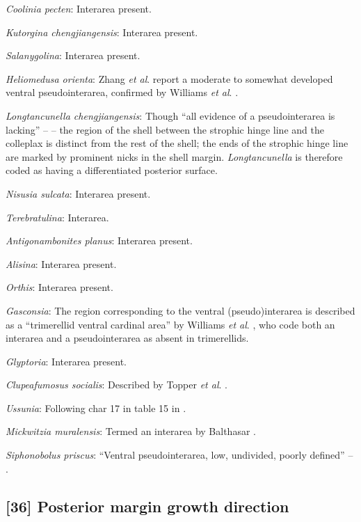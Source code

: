 \documentclass[]{book}
\theoremstyle{definition}
\theoremstyle{definition}
\theoremstyle{definition}
\theoremstyle{remark}
\begin{document}
\emph{Coolinia pecten}: Interarea present.

\emph{Kutorgina chengjiangensis}: Interarea present.

\emph{Salanygolina}: Interarea present.

\emph{Heliomedusa orienta}: Zhang \emph{et al}.
\citeyearpar{Zhang2009Architectureand} report a moderate to somewhat
developed ventral pseudointerarea, confirmed by Williams \emph{et al}.
\citeyearpar{Williams2007PartH}.

\emph{Longtancunella chengjiangensis}: Though ``all evidence of a
pseudointerarea is lacking'' -- \citet{Zhang2011Theexceptionally} -- the
region of the shell between the strophic hinge line and the colleplax
\citep[fig. 2 in][]{Zhang2011Theexceptionally} is distinct from the rest
of the shell; the ends of the strophic hinge line are marked by
prominent nicks in the shell margin. \emph{Longtancunella} is therefore
coded as having a differentiated posterior surface.

\emph{Nisusia sulcata}: Interarea present.

\emph{Terebratulina}: Interarea.

\emph{Antigonambonites planus}: Interarea present.

\emph{Alisina}: Interarea present.

\emph{Orthis}: Interarea present.

\emph{Gasconsia}: The region corresponding to the ventral
(pseudo)interarea is described as a ``trimerellid ventral cardinal
area'' by Williams \emph{et al}.
\citeyearpar[p.162]{Williams2000BrachiopodaLinguliformea}, who code both
an interarea and a pseudointerarea as absent in trimerellids.

\emph{Glyptoria}: Interarea present.

\emph{Clupeafumosus socialis}: Described by Topper \emph{et al}.
\citeyearpar{Topper2013Reappraisalof}.

\emph{Ussunia}: Following char 17 in table 15 in
\citet{Williams2000BrachiopodaLinguliformea}.

\emph{Mickwitzia muralensis}: Termed an interarea by Balthasar
\citeyearpar{Balthasar2004Shellstructure}.

\emph{Siphonobolus priscus}: ``Ventral pseudointerarea, low, undivided,
poorly defined'' -- \citet{Williams2000BrachiopodaLinguliformea}.

\hypertarget{posterior-margin-growth-direction}{%
\subsection*{{[}36{]} Posterior margin growth
direction}\label{posterior-margin-growth-direction}}
\end{document}
